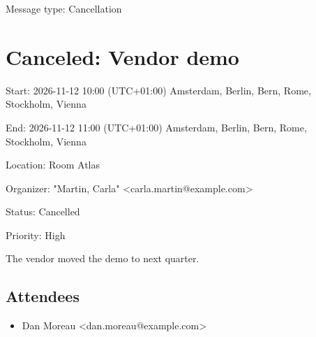 \documentclass[11pt,a4paper]{article}
\begin{document}
Message type: Cancellation

\section{Canceled: Vendor demo}

Start: 2026-11-12 10:00 (UTC+01:00) Amsterdam, Berlin, Bern, Rome, Stockholm, Vienna

End: 2026-11-12 11:00 (UTC+01:00) Amsterdam, Berlin, Bern, Rome, Stockholm, Vienna

Location: Room Atlas

Organizer: "Martin, Carla" <carla.martin@example.com>

Status: Cancelled

Priority: High

The vendor moved the demo to next quarter.

\subsection{Attendees}

\begin{itemize}
\item Dan Moreau <dan.moreau@example.com>
\end{itemize}
\end{document}

